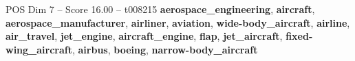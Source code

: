 \begin{textsample}{POS Dim 7 – Score 16.00 – t008215}  \label{ex:f7_pos_031}
\textbf{aerospace\_engineering}, \textbf{aircraft}, \textbf{aerospace\_manufacturer}, \textbf{airliner}, \textbf{aviation}, \textbf{wide-body\_aircraft}, \textbf{airline}, \textbf{air\_travel}, \textbf{jet\_engine}, \textbf{aircraft\_engine}, \textbf{flap}, \textbf{jet\_aircraft}, \textbf{fixed-wing\_aircraft}, \textbf{airbus}, \textbf{boeing}, \textbf{narrow-body\_aircraft}

\end{textsample}
